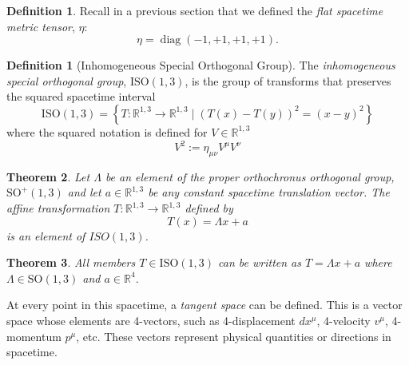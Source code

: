 \documentclass{amsart}
\newtheorem{theorem}{Theorem}[section]
\theoremstyle{definition}
\newtheorem{definition}[theorem]{Definition}
\newtheorem{definition*}{Definition}
\theoremstyle{remark}
\DeclareMathOperator{\diag}{diag}
\begin{document}
\begin{definition*}
  Recall in a previous section that we defined the \emph{flat spacetime metric tensor}, $\eta$:
  \begin{equation*}
    \eta = \diag(-1, +1, +1, +1).
  \end{equation*}
\end{definition*}

\begin{definition}[Inhomogeneous Special Orthogonal Group]
  The \emph{inhomogeneous special orthogonal group}, $\mathrm{ISO}(1,3)$, is the group of transforms that preserves the squared spacetime interval
  \begin{equation*}
    \mathrm{ISO}(1, 3)=\left\{T:\mathbb{R}^{1,3}\to\mathbb{R}^{1,3}\mid \left(T(x)-T(y)\right)^2
=(x-y)^2\right\}
  \end{equation*}
  where the squared notation is defined for $V\in\mathbb{R}^{1,3}$
  \begin{equation*}
    V^2:=\eta_{\mu\nu}V^\mu V^\nu
  \end{equation*}
\end{definition}

\begin{theorem}
  Let $\Lambda$ be an element of the proper orthochronus orthogonal group, $\mathrm{SO}^+(1,3)$ and let $a\in\mathbb{R}^{1,3}$ be any constant spacetime translation vector. The affine transformation $T:\mathbb{R}^{1,3}\to\mathbb{R}^{1,3}$ defined by
  \begin{equation*}
    T(x) = \Lambda x + a
  \end{equation*}
  is an element of $ISO(1,3)$.
\end{theorem}

\begin{theorem}
  All members $T\in\mathrm{ISO}(1,3)$ can be written as $T=\Lambda x + a$ where $\Lambda\in\mathrm{SO}(1, 3)$ and $a\in\mathbb{R}^4$.
\end{theorem}

At every point in this spacetime, a \emph{tangent space} can be defined.
This is a vector space whose elements are 4-vectors, such as 4-displacement $dx^\mu$, 4-velocity $v^\mu$, 4-momentum $p^\mu$, etc.
These vectors represent physical quantities or directions in spacetime.
\end{document}
